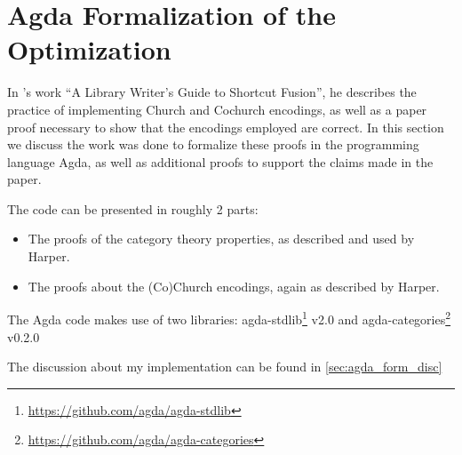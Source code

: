 \section{Agda Formalization of the Optimization}\label{sec:formalization}
In \cite{Harper2011}'s work ``A Library Writer's Guide to Shortcut Fusion'', he describes the practice of implementing Church and Cochurch encodings, as well as a paper proof necessary to show that the encodings employed are correct.
In this section we discuss the work was done to formalize these proofs in the programming language Agda, as well as additional proofs to support the claims made in the paper.

The code can be presented in roughly 2 parts:
\begin{itemize}[noitemsep]
  \item The proofs of the category theory properties, as described and used by Harper.
  \item The proofs about the (Co)Church encodings, again as described by Harper.
\end{itemize}

The Agda code makes use of two libraries: agda-stdlib\footnote{\url{https://github.com/agda/agda-stdlib}} v2.0 and agda-categories\footnote{\url{https://github.com/agda/agda-categories}} v0.2.0


The discussion about my implementation can be found in \autoref{sec:agda_form_disc}




